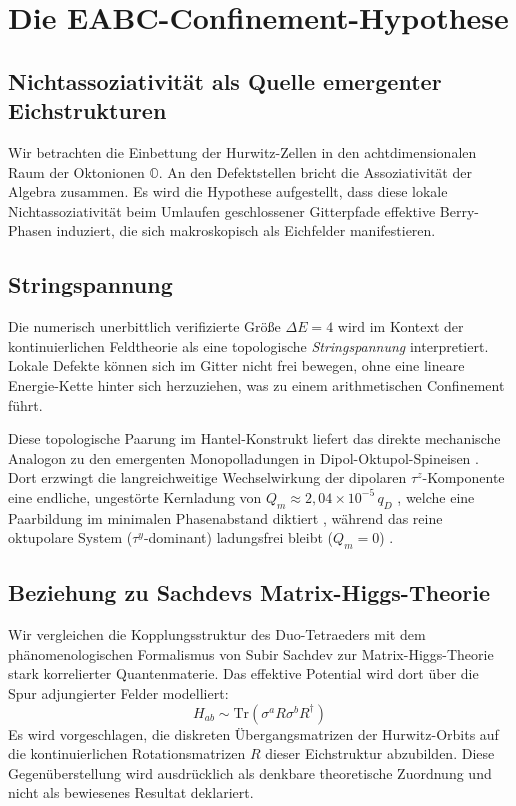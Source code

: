 \documentclass[11pt,a4paper]{article}
\newcommand{\Oalg}{\mathbb{O}}
\begin{document}
\section{Die EABC-Confinement-Hypothese}

\subsection{Nichtassoziativität als Quelle emergenter Eichstrukturen}
Wir betrachten die Einbettung der Hurwitz-Zellen in den achtdimensionalen Raum der Oktonionen $\Oalg$. An den Defektstellen bricht die Assoziativität der Algebra zusammen. Es wird die Hypothese aufgestellt, dass diese lokale Nichtassoziativität beim Umlaufen geschlossener Gitterpfade effektive Berry-Phasen induziert, die sich makroskopisch als Eichfelder manifestieren.

\subsection{Stringspannung}
Die numerisch unerbittlich verifizierte Größe $\Delta E = 4$ wird im Kontext der kontinuierlichen Feldtheorie als eine topologische \textit{Stringspannung} interpretiert. Lokale Defekte können sich im Gitter nicht frei bewegen, ohne eine lineare Energie-Kette hinter sich herzuziehen, was zu einem arithmetischen Confinement führt. 

Diese topologische Paarung im Hantel-Konstrukt liefert das direkte mechanische Analogon zu den emergenten Monopolladungen in Dipol-Oktupol-Spineisen \cite{8, 34}. Dort erzwingt die langreichweitige Wechselwirkung der dipolaren $\tau^z$-Komponente eine endliche, ungestörte Kernladung von $Q_m \approx 2{,}04 \times 10^{-5}\,q_D$ \cite{157}, welche eine Paarbildung im minimalen Phasenabstand diktiert \cite{154}, während das reine oktupolare System ($\tau^y$-dominant) ladungsfrei bleibt ($Q_m = 0$) \cite{145}.

\subsection{Beziehung zu Sachdevs Matrix-Higgs-Theorie}
Wir vergleichen die Kopplungsstruktur des Duo-Tetraeders mit dem phänomenologischen Formalismus von Subir Sachdev zur Matrix-Higgs-Theorie stark korrelierter Quantenmaterie. Das effektive Potential wird dort über die Spur adjungierter Felder modelliert:
\begin{equation}
	H_{ab} \sim \text{Tr}(\sigma^a R \sigma^b R^\dagger)
\end{equation}
Es wird vorgeschlagen, die diskreten Übergangsmatrizen der Hurwitz-Orbits auf die kontinuierlichen Rotationsmatrizen $R$ dieser Eichstruktur abzubilden. Diese Gegenüberstellung wird ausdrücklich als denkbare theoretische Zuordnung und nicht als bewiesenes Resultat deklariert.
\end{document}
